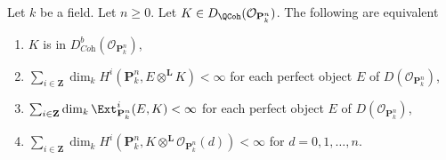 \begin{lemma}
\label{lemma-coherent-on-projective-space}
Let $k$ be a field. Let $n \geq 0$. Let
$K \in D_\QCoh(\mathcal{O}_{\mathbf{P}^n_k})$.
The following are equivalent
\begin{enumerate}
\item $K$ is in $D^b_{\textit{Coh}}(\mathcal{O}_{\mathbf{P}^n_k})$,
\item $\sum_{i \in \mathbf{Z}}
\dim_k H^i(\mathbf{P}^n_k, E \otimes^\mathbf{L} K) < \infty$
for each perfect object $E$ of
$D(\mathcal{O}_{\mathbf{P}^n_k})$,
\item $\sum_{i \in \mathbf{Z}}
\dim_k \Ext^i_{\mathbf{P}^n_k}(E, K) < \infty$
for each perfect object $E$ of $D(\mathcal{O}_{\mathbf{P}^n_k})$,
\item $\sum_{i \in \mathbf{Z}} \dim_k H^i(\mathbf{P}^n_k,
K \otimes^\mathbf{L} \mathcal{O}_{\mathbf{P}^n_k}(d)) < \infty$
for $d = 0, 1, \ldots, n$.
\end{enumerate}
\end{lemma}


